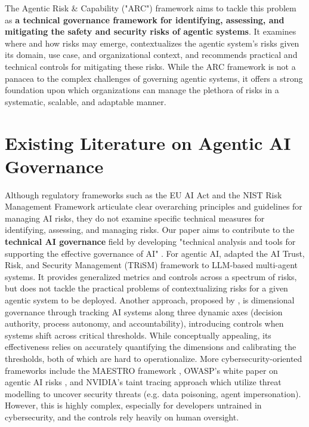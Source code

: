 \documentclass{article}
\begin{document}
The Agentic Risk \& Capability ("ARC") framework aims to tackle this problem as \textbf{a technical governance framework for identifying, assessing, and mitigating the safety and security risks of agentic systems}. It examines where and how risks may emerge, contextualizes the agentic system's risks given its domain, use case, and organizational context, and recommends practical and technical controls for mitigating these risks. While the ARC framework is not a panacea to the complex challenges of governing agentic systems, it offers a strong foundation upon which organizations can manage the plethora of risks in a systematic, scalable, and adaptable manner.

\section{Existing Literature on Agentic AI Governance}

Although regulatory frameworks such as the EU AI Act \citep{eu_ai_act} and the NIST Risk Management Framework \citep{nist_ai_rmf} articulate clear overarching principles and guidelines for managing AI risks, they do not examine specific technical measures for identifying, assessing, and managing risks. Our paper aims to contribute to the \textbf{technical AI governance} field by developing "technical analysis and tools for supporting the effective governance of AI" \citep{reuel2025openproblemstechnicalai}. For agentic AI, \citet{raza2025trismagenticaireview} adapted the AI Trust, Risk, and Security Management (TRiSM) framework to LLM-based multi-agent systems. It provides generalized metrics and controls across a spectrum of risks, but does not tackle the practical problems of contextualizing risks for a given agentic system to be deployed. Another approach, proposed by \citet{engin2025adaptivecategoriesdimensionalgovernance}, is dimensional governance through tracking AI systems along three dynamic axes (decision authority, process autonomy, and accountability), introducing controls when systems shift across critical thresholds. While conceptually appealing, its effectiveness relies on accurately quantifying the dimensions and calibrating the thresholds, both of which are hard to operationalize. More cybersecurity-oriented frameworks include the MAESTRO framework \citep{huang2025_resilience}, OWASP's white paper on agentic AI risks \citep{owasp2025_agentic_threats}, and NVIDIA's taint tracing approach \citep{nvidia2025_autonomy} which utilize threat modelling to uncover security threats (e.g. data poisoning, agent impersonation). However, this is highly complex, especially for developers untrained in cybersecurity, and the controls rely heavily on human oversight. 
\end{document}
